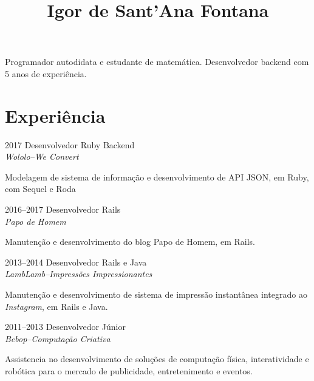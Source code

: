 \documentclass[a4paper,twoside]{simplecv}
\begin{document}


\title{Igor de Sant'Ana Fontana}

\maketitle

Programador autodidata e estudante de matemática. Desenvolvedor backend com 5
anos de experiência.

\section{Experiência}

\begin{topic}
\item[2017] Desenvolvedor Ruby Backend\\
	{\em\small Wololo--We Convert}

	Modelagem de sistema de informação e desenvolvimento de API JSON, em
	Ruby, com Sequel e Roda

\item[2016--2017] Desenvolvedor Rails\\
	{\em\small Papo de Homem}

	Manutenção e desenvolvimento do blog Papo de Homem, em Rails.

\item[2013--2014] Desenvolvedor Rails e Java\\
	{\em\small LambLamb--Impressões Impressionantes}

	Manutenção e desenvolvimento de sistema de impressão instantânea
	integrado ao \emph{Instagram}, em Rails e Java.

\item[2011--2013] Desenvolvedor Júnior\\
	{\em\small Bebop--Computação Criativa}

	Assistencia no desenvolvimento de soluções de computação física,
	interatividade e robótica para o mercado de publicidade, entretenimento
	e eventos.
\end{topic}
\end{document}
